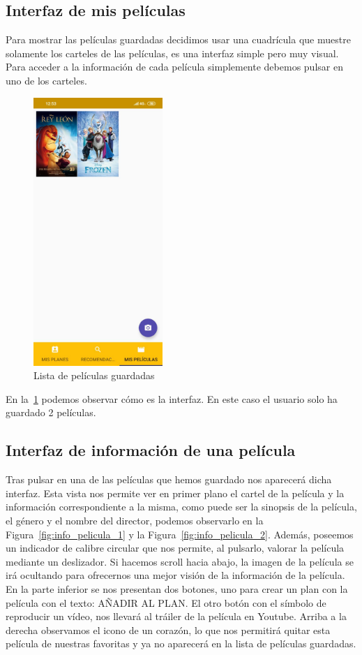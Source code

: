 \subsection{Interfaz de mis películas}
\label{makereference3.4.4}
Para mostrar las películas guardadas decidimos usar una cuadrícula que muestre solamente los carteles de las películas, es una interfaz simple pero muy visual. Para acceder a la información
de cada película simplemente debemos pulsar en uno de los carteles.
\begin{figure}[H]
    \centering
    \includegraphics[height=4in]{figures/FilmsList.jpg}
    \caption{Lista de películas guardadas}
    \label{fig:lista_peliculas}
\end{figure}
En la~\ref{fig:lista_peliculas} podemos observar cómo es la interfaz. En este caso el usuario solo ha guardado 2 películas.
\subsection{Interfaz de información de una película}
\label{makereference3.4.5}

Tras pulsar en una de las películas que hemos guardado nos aparecerá dicha interfaz. 
Esta vista nos permite ver en primer plano el cartel de la película y la información correspondiente a la misma, como puede
ser la sinopsis de la película, el género y el nombre del director, podemos observarlo en la Figura~\ref{fig:info_pelicula_1} y la Figura~\ref{fig:info_pelicula_2}. Además, poseemos un indicador de calibre circular que nos permite, al pulsarlo,
valorar la película mediante un deslizador.
Si hacemos scroll hacia abajo, la imagen de la película se irá ocultando para ofrecernos una mejor visión de la información de la película.
En la parte inferior se nos presentan dos botones, uno para crear un plan con la película con el texto: AÑADIR AL PLAN. El otro botón con el símbolo de reproducir un vídeo, nos llevará al tráiler de la película en Youtube.
Arriba a la derecha observamos el icono de un corazón, lo que nos permitirá quitar esta película de nuestras favoritas y ya no aparecerá en la
lista de películas guardadas.

